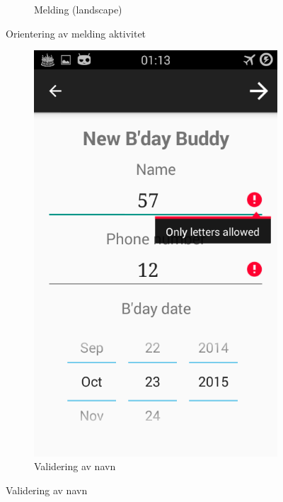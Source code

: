 \begin{figure}[ht]
\begin{subfigure}[b]{0.6\textwidth}
        \caption{Melding (landscape)}
        \label{fig:melding_l}
    \end{subfigure}
    \caption{Orientering av melding aktivitet}
    \label{fig:melding_aktivitet}
\end{figure}

\begin{figure}[ht]
    \centering
    \begin{subfigure}[b]{0.35\textwidth}
        \includegraphics[width=\textwidth]{./img/15.png}
        \caption{Validering av navn}
        \label{fig:validering_tekst}
    \end{subfigure}

\end{figure}
